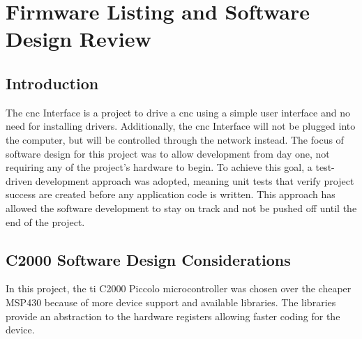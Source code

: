 \chapter{Firmware Listing and Software Design Review}

\section{Introduction}
The \gls{cnc} Interface is a project to drive a \gls{cnc} using a simple user interface and no need for installing drivers.
Additionally, the \gls{cnc} Interface will not be plugged into the computer, but will be controlled through the network instead.
The focus of software design for this project was to allow development from day one, not requiring any of the project's hardware to begin.
To achieve this goal, a test-driven development approach was adopted, meaning unit tests that verify project success are created before any application code is written.
This approach has allowed the software development to stay on track and not be pushed off until the end of the project.

\section{C2000 Software Design Considerations}
In this project, the \gls{ti} C2000 Piccolo microcontroller was chosen over the cheaper MSP430 because of more device support and available libraries.
The libraries provide an abstraction to the hardware registers allowing faster coding for the device. 

